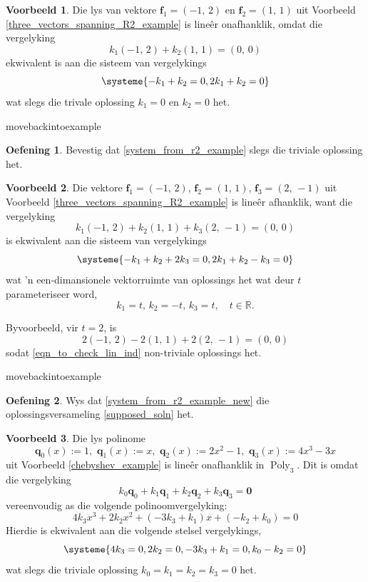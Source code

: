\documentclass[a4paper,11pt]{book}
\theoremstyle{definition}
\newtheorem{exercise}{Oefening}
\newtheorem{example_environment}{Voorbeeld}[chapter]
\newcommand{\be}{\begin{equation}}
\newcommand{\ee}{\end{equation}}
\newcommand{\ve}[1]{\mathbf{#1}}
\newenvironment{example}
	{
		\begin{oframed}
		\begin{example_environment}
	}
	{
		\end{example_environment}
		\end{oframed}
	}
\DeclareMathOperator{\Poly}{Poly}
\begin{document}
\begin{example} Die lys van vektore $\ve{f}_1 = (-1, \, 2)$ en $\ve{f}_2 =
	(1, \,1)$ uit Voorbeeld \ref{three_vectors_spanning_R2_example} is
	line{\^e}r onafhanklik, omdat die vergelyking
	\[
		k_1 (-1, \, 2) + k_2 (1, \, 1) = (0, \, 0)
	\]
	ekwivalent is aan die sisteem van vergelykings
	\be \label{system_from_r2_example}
	\systeme{-k_1 + k_2 = 0, 2k_1 + k_2 = 0}
	\ee
	wat slegs die trivale oplossing $k_1 = 0$ en $k_2 = 0$ het.
	
\end{example}movebackintoexample
\begin{exercise} Bevestig dat \eqref{system_from_r2_example} slegs die
	triviale oplossing het.
\end{exercise}
\begin{example} \label{example_about_lin_dep_1} Die vektore $\ve{f}_1 =
	(-1, \, 2)$, $\ve{f}_2 = (1, \,1)$, $\ve{f}_3 = (2, \, -1)$ uit
	Voorbeeld  \ref{three_vectors_spanning_R2_example} is line{\^e}r
	afhanklik, want die vergelyking
	\be \label{eqn_to_check_lin_ind}
	k_1 (-1, \, 2) + k_2 (1, \, 1) + k_3 (2, \, -1) = (0, \, 0)
	\ee
	is ekwivalent aan die sisteem van vergelykings
	\be \label{system_from_r2_example_new}
	\systeme{-k_1 + k_2 + 2k_3 = 0, 2k_1 + k_2 - k_3 = 0}
	\ee
	wat 'n een-dimansionele vektorruimte van oplossings het wat deur $t$
	parameteriseer word,
	\be \label{supposed_soln}
	k_1 = t, \, k_2 = -t, \, k_3 = t, \quad t \in \mathbb{R}.
	\ee
	
	Byvoorbeeld, vir $t=2$, is
	\[
		2 (-1, \, 2) - 2 (1, \, 1) + 2 (2, \, -1) = (0, \, 0)
	\]
	sodat \eqref{eqn_to_check_lin_ind} non-triviale oplossings het.
\end{example}movebackintoexample
\begin{exercise}
	Wys dat \eqref{system_from_r2_example_new} die
	oplossingsversameling \eqref{supposed_soln} het.
\end{exercise}
\begin{example} 
	\label{new_basis_for_poly_3}
	Die lys polinome
	\[
		\ve{q}_0 (x) := 1, \,\, \ve{q}_1 (x) := x, \,\, \ve{q}_2 (x) :=
		2x^2 - 1, \,\, \ve{q}_3 (x) := 4x^3 - 3x
	\]
	uit Voorbeeld \ref{chebyshev_example} is line{\^e}r onafhanklik in
	$\Poly_3$. Dit is omdat die vergelyking
	\[
		k_0 \ve{q}_0 + k_1 \ve{q}_1 + k_2 \ve{q}_2 + k_3 \ve{q}_3 = \ve{0}
	\]
	vereenvoudig as die volgende polinoomvergelyking:
	\[
		4k_3 x^3 + 2k_2 x^2 + (-3k_3 + k_1) x + (-k_2 + k_0) = 0
	\]
	Hierdie is ekwivalent aan die volgende stelsel vergelykings,
	\[
		\systeme{ 4k_3 = 0, 2k_2 = 0, -3 k_3 + k_1 = 0 , k_0 - k_2 = 0}
	\]
	wat slegs die triviale oplossing $k_0 = k_1 = k_2 = k_3 = 0$ het.
\end{example}
\end{document}

